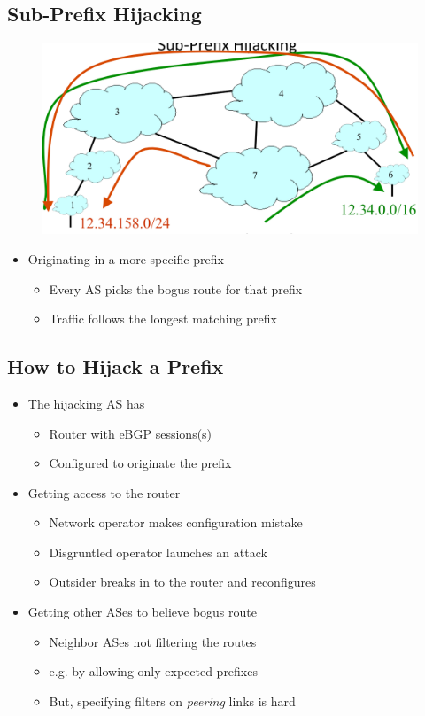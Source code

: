 \subsection{Sub-Prefix Hijacking}
\begin{figure}[H]
    \includegraphics[scale=0.5]{lazy/subprefixhijacking.png}
\end{figure}
\begin{itemize}
    \item Originating in a more-specific prefix
          \begin{itemize}
              \item Every AS picks the bogus route for that prefix
              \item Traffic follows the longest matching prefix
          \end{itemize}
\end{itemize}

\subsection{How to Hijack a Prefix}
\begin{itemize}
    \item The hijacking AS has
          \begin{itemize}
              \item Router with eBGP sessions(s)
              \item Configured to originate the prefix
          \end{itemize}
    \item Getting access to the router
          \begin{itemize}
              \item Network operator makes configuration mistake
              \item Disgruntled operator launches an attack
              \item Outsider breaks in to the router and reconfigures
          \end{itemize}
    \item Getting other ASes to believe bogus route
          \begin{itemize}
              \item Neighbor ASes not filtering the routes
              \item e.g. by allowing only expected prefixes
              \item But, specifying filters on \emph{peering} links is hard
          \end{itemize}
\end{itemize}

